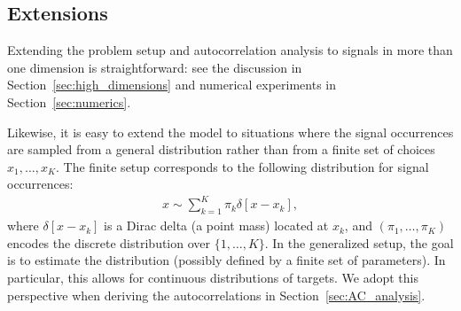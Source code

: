 \documentclass[12pt]{article}
\newcommand{\1}{\mathbf{1}}
\newcommand{\TODO}[1]{{\color{red}{[#1]}}}
\theoremstyle{plain}
\theoremstyle{definition}
\theoremstyle{remark}
\theoremstyle{plain}
\theoremstyle{remark}
\theoremstyle{plain}
\theoremstyle{plain}
\theoremstyle{plain}
\numberwithin{equation}{section}
\begin{document}
%
%

 
 
 
\subsection*{Extensions} \label{sec:extensions}

Extending the problem setup and autocorrelation analysis to signals in more than one dimension is straightforward: see the discussion in Section~\ref{sec:high_dimensions} and numerical experiments in Section~\ref{sec:numerics}.

Likewise, it is easy to extend the model to situations where the signal occurrences are sampled from a general distribution rather than from a finite set of choices $x_1, \ldots, x_K$. The finite setup corresponds to the following distribution for signal occurrences:
\begin{align}
	x \sim \sum_{k=1}^K \pi_k \delta[x - x_k],
	\label{eq:heterogeneousdistribution}
\end{align}
where $\delta[x - x_k]$ is a Dirac delta (a point mass) located at $x_k$, and $(\pi_1, \ldots, \pi_K)$ encodes the discrete distribution over $\{1, \ldots, K\}$.
In the generalized setup, the goal is to estimate the distribution (possibly defined by a finite set of parameters). In particular, this allows for continuous distributions of targets. We adopt this perspective when deriving the autocorrelations in Section~\ref{sec:AC_analysis}.
\end{document}
